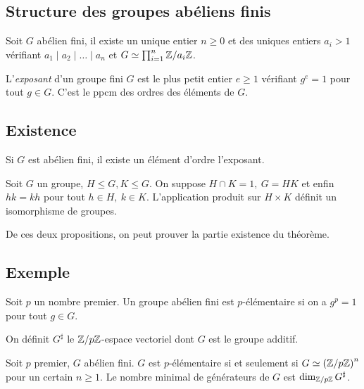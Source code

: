 \documentclass{cours}
\begin{document}
\subsection{Structure des groupes abéliens finis}
\begin{theorem}\label{structuregrpabelfinis}
    Soit $G$ abélien fini, il existe un unique entier $n\geq 0$ et des uniques entiers $a_{i} > 1$ vérifiant $a_{1} \mid a_{2} \mid \ldots \mid a_{n}$ et $G \simeq \prod_{i=1}^{n} \mathbb{Z}/a_{i}\mathbb{Z}$.
\end{theorem}

\begin{definition}
    L'\emph{exposant} d'un groupe fini $G$ est le plus petit entier $e \geq 1$ vérifiant $g^{e} = 1$ pour tout $g \in G$. C'est le ppcm des ordres des éléments de $G$.
\end{definition}

\subsection{Existence}
\begin{lemma}
    Si $G$ est abélien fini, il existe un élément d'ordre l'exposant.
\end{lemma}

\begin{proposition}
    Soit $G$ un groupe, $H\leq G, K \leq G$. On suppose $H \cap K = 1, \ G = HK$ et enfin $hk = kh$ pour tout $h \in H,\ k \in K$. L'application produit sur $H \times K$ définit un isomorphisme de groupes.
\end{proposition}

De ces deux propositions, on peut prouver la partie existence du théorème.

\subsection{Exemple}
\begin{definition}
    Soit $p$ un nombre premier. Un groupe abélien fini est $p$-élémentaire si on a $g^{p} = 1$ pour tout $g \in G$.
\end{definition}

\begin{definition}
    On définit $G^{\sharp}$ le $\mathbb{Z}/p\mathbb{Z}$-espace vectoriel dont $G$ est le groupe additif.
\end{definition}

\begin{proposition}
    Soit $p$ premier, $G$ abélien fini. $G$ est $p$-élémentaire si et seulement si $G \simeq \left(\mathbb{Z}/p\mathbb{Z}\right)^{n}$ pour un certain $n \geq 1$. Le nombre minimal de générateurs de $G$ est $\dim_{\mathbb{Z}/p\mathbb{Z}}G^{\sharp}$.
\end{proposition}
\end{document}
